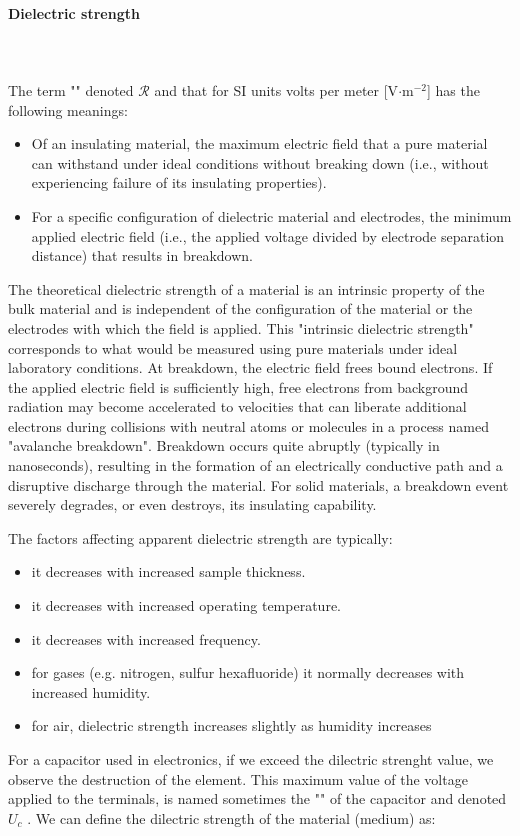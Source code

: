 	\paragraph{Dielectric strength}\mbox{}\\\\
	The term "" denoted $\mathcal{R}$ and that for SI units volts per meter [V$\cdot$m$^{-2}$] has the following meanings:
	\begin{itemize}
		\item Of an insulating material, the maximum electric field that a pure material can withstand under ideal conditions without breaking down (i.e., without experiencing failure of its insulating properties).
		
		\item For a specific configuration of dielectric material and electrodes, the minimum applied electric field (i.e., the applied voltage divided by electrode separation distance) that results in breakdown.
	\end{itemize}
	The theoretical dielectric strength of a material is an intrinsic property of the bulk material and is independent of the configuration of the material or the electrodes with which the field is applied. This "intrinsic dielectric strength" corresponds to what would be measured using pure materials under ideal laboratory conditions. At breakdown, the electric field frees bound electrons. If the applied electric field is sufficiently high, free electrons from background radiation may become accelerated to velocities that can liberate additional electrons during collisions with neutral atoms or molecules in a process named "avalanche breakdown". Breakdown occurs quite abruptly (typically in nanoseconds), resulting in the formation of an electrically conductive path and a disruptive discharge through the material. For solid materials, a breakdown event severely degrades, or even destroys, its insulating capability.

	The factors affecting apparent dielectric strength are typically:
	\begin{itemize}
		\item it decreases with increased sample thickness.
		\item it decreases with increased operating temperature.
		\item it decreases with increased frequency.
		\item for gases (e.g. nitrogen, sulfur hexafluoride) it normally decreases with increased humidity.
		\item for air, dielectric strength increases slightly as humidity increases
	\end{itemize}
	For a capacitor used in electronics, if we exceed the dilectric strenght value, we observe the destruction of the element. This maximum value of the voltage applied to the terminals, is named sometimes the "" of the capacitor and denoted $U_c$ . We can define the dilectric strength of the material (medium) as:
	
